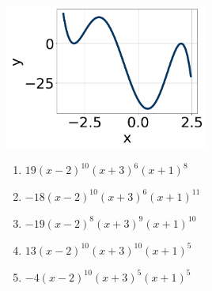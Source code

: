 \documentclass[14pt]{extbook}
\begin{document}
\begin{enumerate}
{\begin{center}
    \includegraphics[width=0.5\textwidth]{../Figures/polyGraphToFunctionC.png}
\end{center}
\begin{enumerate}[label=\Alph*.]
\item \( 19(x - 2)^{10} (x + 3)^{6} (x + 1)^{8} \)
\item \( -18(x - 2)^{10} (x + 3)^{6} (x + 1)^{11} \)
\item \( -19(x - 2)^{8} (x + 3)^{9} (x + 1)^{10} \)
\item \( 13(x - 2)^{10} (x + 3)^{10} (x + 1)^{5} \)
\item \( -4(x - 2)^{10} (x + 3)^{5} (x + 1)^{5} \)


\end{enumerate}}
\end{enumerate}
\end{document}

